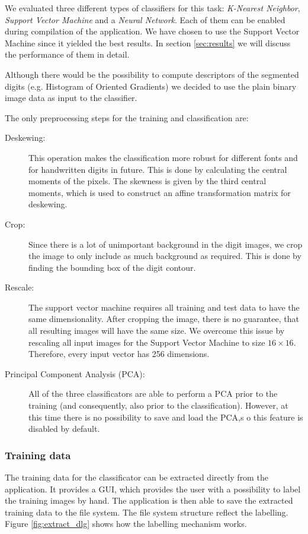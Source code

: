 \documentclass[
a4paper,     %
12pt         %
]{scrartcl}  %
\begin{document}
We evaluated three different types of classifiers for this task: \emph{K-Nearest Neighbor},
\emph{Support Vector Machine} and a \emph{Neural Network}. Each of them can be enabled
during compilation of the application. We have chosen to use the Support Vector Machine
since it yielded the best results. In section \ref{sec:results} we will discuss the performance
of them in detail.

Although there would be the possibility to compute descriptors of the segmented digits
(e.g. Histogram of Oriented Gradients) we decided to use the plain binary image data
as input to the classifier.

The only preprocessing steps for the training and classification are:

\begin{description}
  \item[Deskewing:] This operation makes the classification more robust for different
  fonts and for handwritten digits in future. This is done by calculating the central
  moments of the pixels. The skewness is given by the third central moments, which is
  used to construct an affine transformation matrix for deskewing.
  \item[Crop:] Since there is a lot of unimportant background in the digit images, we
  crop the image to only include as much background as required. This is done by finding
  the bounding box of the digit contour.
  \item[Rescale:] The support vector machine requires all training and test data to have
  the same dimensionality. After cropping the image, there is no guarantee, that all resulting
  images will have the same size. We overcome this issue by rescaling all input
  images for the Support Vector Machine to size $16 \times 16$. Therefore, every input
  vector has 256 dimensions.
  \item[Principal Component Analysis (PCA):] All of the three classificators are able to
  perform a PCA prior to the training (and consequently, also prior to the classification).
  However, at this time there is no possibility to save and load the PCA,s o this feature is 
  disabled by default. 
\end{description}

\subsubsection{Training data}

The training data for the classificator can be extracted directly from the application. It
provides a GUI, which provides the user with a possibility to label the training images
by hand. The application is then able to save the extracted training data to the file system.
The file system structure reflect the labelling. Figure \ref{fig:extract_dlg} shows how the
labelling mechanism works.
\end{document}
